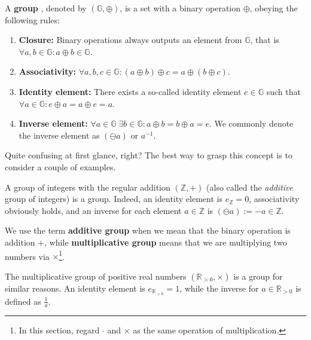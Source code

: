 \documentclass[../lecture-notes-148x210.tex]{subfiles}
\begin{document}
\begin{definition}
    A \textbf{group} \cite[section 3]{Judson_2012}, denoted by $(\mathbb{G}, \oplus)$, is a set with a binary operation $\oplus$, obeying the following rules:
    \begin{enumerate}
        \item \textbf{Closure:} Binary operations always outputs an element from $\mathbb{G}$, that is $\forall a,b \in \mathbb{G}: a \oplus b \in \mathbb{G}$.
        \item \textbf{Associativity:} $\forall a,b,c \in \mathbb{G}: (a \oplus b)\oplus c = a \oplus (b \oplus c)$.
        \item \textbf{Identity element:} There exists a so-called identity element $e \in \mathbb{G}$ such that $\forall a \in \mathbb{G}: e \oplus a = a \oplus e = a$.
        \item \textbf{Inverse element:} $\forall a \in \mathbb{G} \; \exists b \in \mathbb{G}: a\oplus b = b \oplus a = e$. We commonly denote the inverse element as $(\ominus a)$ or $a^{-1}$.
    \end{enumerate}
\end{definition}

Quite confusing at first glance, right? The best way to grasp this concept is to consider a couple of examples.

\begin{example}
    A group of integers with the regular addition $(\mathbb{Z},+)$ (also called the \textit{additive} group of integers) is a group. Indeed, an identity element is $e_{\mathbb{Z}}=0$, associativity obviously holds, and an inverse for each element $a \in \mathbb{Z}$ is $(\ominus a) := -a \in \mathbb{Z}$. 
\end{example}

\begin{remark}
    We use the term \textbf{additive group} when we mean that the binary operation is addition $+$, while \textbf{multiplicative group} means that we are multiplying two numbers via $\times$\footnote{In this section, regard $\cdot$ and $\times$ as the same operation of multiplication.}.
\end{remark}

\begin{example}
    The multiplicative group of positive real numbers $(\mathbb{R}_{> 0}, \times)$ is a group for similar reasons. An identity element is $e_{\mathbb{R}_{>0}} = 1$, while the inverse for $a \in \mathbb{R}_{>0}$ is defined as $\frac{1}{a}$.
\end{example}
\end{document}
